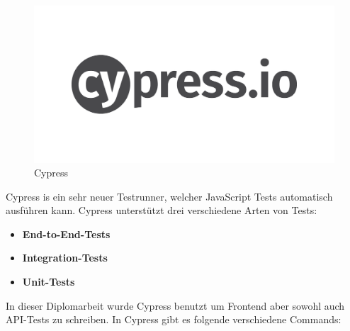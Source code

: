 \begin{figure}[h]
    \centering
    \includegraphics[width=0.5\linewidth]{pics/cypress-logo.png}
    \caption{Cypress}
    \label{fig:enter-label}
\end{figure}


Cypress is ein sehr neuer Testrunner, welcher JavaScript Tests automatisch ausführen kann.
Cypress unterstützt drei verschiedene Arten von Tests:

\begin{itemize}
\item \textbf{End-to-End-Tests}
\item \textbf{Integration-Tests}
\item \textbf{Unit-Tests}
\end{itemize}

In dieser Diplomarbeit wurde Cypress benutzt um Frontend aber sowohl auch API-Tests zu schreiben.
In Cypress gibt es folgende verschiedene Commands:

